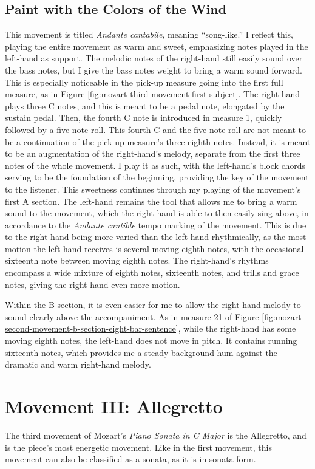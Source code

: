\subsection{Paint with the Colors of the Wind}

This movement is titled \textit{Andante cantabile}, meaning ``song-like.'' I reflect this, playing the entire movement as warm and sweet, emphasizing notes played in the left-hand as support. The melodic notes of the right-hand still easily sound over the bass notes, but I give the bass notes weight to bring a warm sound forward. This is especially noticeable in the pick-up measure going into the first full measure, as in Figure \ref{fig:mozart-third-movement-first-subject}. The right-hand plays three C notes, and this is meant to be a pedal note, elongated by the sustain pedal. Then, the fourth C note is introduced in measure 1, quickly followed by a five-note roll. This fourth C and the five-note roll are not meant to be a continuation of the pick-up measure's three eighth notes. Instead, it is meant to be an augmentation of the right-hand's melody, separate from the first three notes of the whole movement. I play it as such, with the left-hand's block chords serving to be the foundation of the beginning, providing the key of the movement to the listener. This sweetness continues through my playing of the movement's first A section. The left-hand remains the tool that allows me to bring a warm sound to the movement, which the right-hand is able to then easily sing above, in accordance to the \textit{Andante cantible} tempo marking of the movement. This is due to the right-hand being more varied than the left-hand rhythmically, as the most motion the left-hand receives is several moving eighth notes, with the occasional sixteenth note between moving eighth notes. The right-hand's rhythms encompass a wide mixture of eighth notes, sixteenth notes, and trills and grace notes, giving the right-hand even more motion. 

Within the B section, it is even easier for me to allow the right-hand melody to sound clearly above the accompaniment. As in measure 21 of Figure \ref{fig:mozart-second-movement-b-section-eight-bar-sentence}\autocite{Henle_1977}, while the right-hand has some moving eighth notes, the left-hand does not move in pitch. It contains running sixteenth notes, which provides me a steady background hum against the dramatic and warm right-hand melody. 

\section{Movement III: Allegretto}
The third movement of Mozart's \textit{Piano Sonata in C Major} is the Allegretto, and is the piece's most energetic movement. Like in the first movement, this movement can also be classified as a sonata, as it is in sonata form. 

